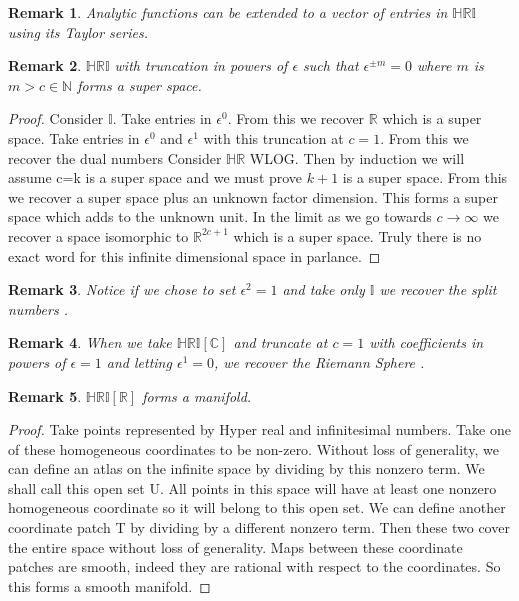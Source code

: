 \documentclass[10pt, oneside]{article}
\newcommand{\R}{\mathbb{R}}
\newcommand{\N}{\mathbb{N}}
\newcommand{\I}{\mathbb{I}}
\newcommand{\HR}{\mathbb{HR}}
\newcommand{\HRI}{\mathbb{HRI}}
\newtheorem{rem}{Remark}
\begin{document}
\begin{rem}
    Analytic functions can be extended to a vector of entries in $\HRI$ using its Taylor series. 
\end{rem}
\begin{rem}
    $\HRI$ with truncation in powers of $\epsilon$ such that $\epsilon^{\pm m}=0$ where $m$ is $m>c\in \N$ forms a super space.  
\end{rem}
\begin{proof}
    Consider $\I$. Take entries in $\epsilon^{0}$. From this we recover $\R$ which is a super space. Take entries in $\epsilon^0 $ and $ \epsilon^1$ with this truncation at $c=1$. From this we recover the dual numbers \cite{Angeles1998} Consider $\HR$ WLOG. 
    Then by induction we will assume c=k is a super space and we must prove $k+1$ is a super space. From this we recover a super space plus an unknown factor dimension. This forms a super space which adds to the unknown unit. 
    In the limit as we go towards $c \to \infty$ we recover a space isomorphic to $\R^{2c+1}$ which is a super space. Truly there is no exact word for this infinite dimensional space in parlance. 
\end{proof}
\begin{rem}
    Notice if we chose to set $\epsilon^2=1$ and take only $\I$ we recover the split numbers \cite{sobczyk2025}.
\end{rem}
\begin{rem}
    When we take $\HRI[\mathbb{C}]$ and truncate at $c = 1$ with coefficients in powers of $\epsilon = 1$ and letting $\epsilon^1 = 0$, we recover the Riemann Sphere \cite{beck2020}.
\end{rem}
\begin{rem}
    $\HRI[\R]$ forms a manifold. 
\end{rem}
\begin{proof}
    Take points represented by Hyper real and infinitesimal numbers. Take one of these homogeneous coordinates to be non-zero. Without loss of generality, we can define an atlas on the infinite space by dividing by this nonzero term.
    We shall call this open set U. All points in this space will have at least one nonzero homogeneous coordinate so it will belong to this open set. We can define another coordinate patch T by dividing by a different nonzero term. Then these two cover the entire space without loss of generality. 
    Maps between these coordinate patches are smooth, indeed they are rational with respect to the coordinates. So this forms a smooth manifold. 
\end{proof}
\end{document}
